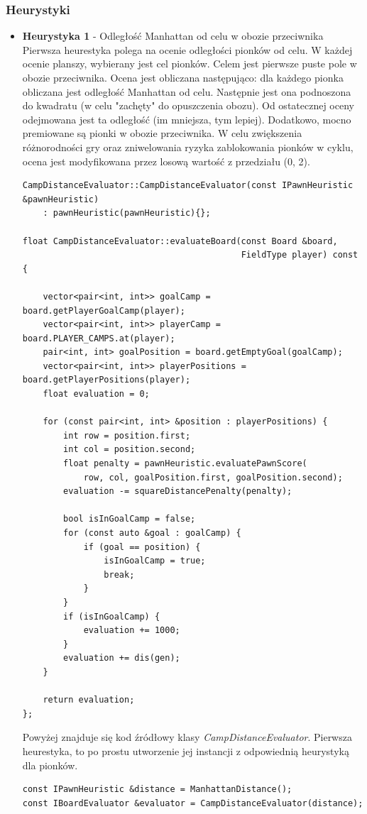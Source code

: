 \documentclass[a4paper, 12pt]{article}
\begin{document}
\subsubsection{Heurystyki}
\begin{itemize}
  \item \textbf{Heurystyka 1} - Odległość Manhattan od celu w obozie przeciwnika\\
  Pierwsza heurestyka polega na ocenie odległości pionków od celu.
  W każdej ocenie planszy, wybierany jest cel pionków. 
  Celem jest pierwsze puste pole w obozie przeciwnika.
  Ocena jest obliczana następująco:
  dla każdego pionka obliczana jest odległość Manhattan od celu.
  Następnie jest ona podnoszona do kwadratu (w celu "zachęty" do opuszczenia obozu).
  Od ostatecznej oceny odejmowana jest ta odległość (im mniejsza, tym lepiej).
  Dodatkowo, mocno premiowane są pionki w obozie przeciwnika. W celu 
  zwiększenia różnorodności gry oraz zniwelowania ryzyka zablokowania 
  pionków w cyklu, ocena jest modyfikowana przez losową wartość z przedziału (0, 2).
\begin{lstlisting}
CampDistanceEvaluator::CampDistanceEvaluator(const IPawnHeuristic &pawnHeuristic)
    : pawnHeuristic(pawnHeuristic){};

float CampDistanceEvaluator::evaluateBoard(const Board &board,
                                           FieldType player) const {

    vector<pair<int, int>> goalCamp = board.getPlayerGoalCamp(player);
    vector<pair<int, int>> playerCamp = board.PLAYER_CAMPS.at(player);
    pair<int, int> goalPosition = board.getEmptyGoal(goalCamp);
    vector<pair<int, int>> playerPositions = board.getPlayerPositions(player);
    float evaluation = 0;

    for (const pair<int, int> &position : playerPositions) {
        int row = position.first;
        int col = position.second;
        float penalty = pawnHeuristic.evaluatePawnScore(
            row, col, goalPosition.first, goalPosition.second);
        evaluation -= squareDistancePenalty(penalty);

        bool isInGoalCamp = false;
        for (const auto &goal : goalCamp) {
            if (goal == position) {
                isInGoalCamp = true;
                break;
            }
        }
        if (isInGoalCamp) {
            evaluation += 1000;
        }
        evaluation += dis(gen);
    }

    return evaluation;
};
\end{lstlisting}
Powyżej znajduje się kod źródłowy klasy \textit{CampDistanceEvaluator}.
Pierwsza heurestyka, to po prostu utworzenie jej instancji 
z odpowiednią heurystyką dla pionków.
\begin{lstlisting}
const IPawnHeuristic &distance = ManhattanDistance();
const IBoardEvaluator &evaluator = CampDistanceEvaluator(distance);
\end{lstlisting}



\end{itemize}
\end{document}
